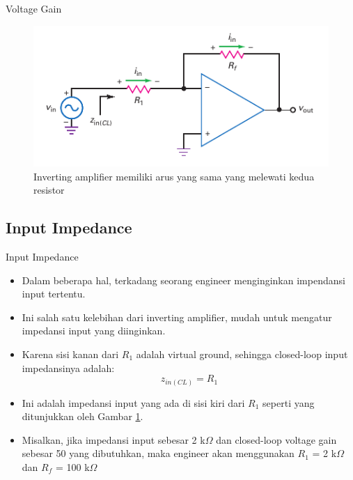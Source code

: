 \begin{frame}{Voltage Gain}
	\begin{figure}
		\centering
		\includegraphics[height=0.4\textheight]{gambar/fig-16.14}
		\caption{Inverting amplifier memiliki arus yang sama yang melewati kedua resistor}
		\label{fig-16.14}
	\end{figure}
\end{frame}

\subsection{Input Impedance}

\begin{frame}{Input Impedance}
	\begin{itemize}
		\item Dalam beberapa hal, terkadang seorang engineer menginginkan impendansi input tertentu.
		\item Ini salah satu kelebihan dari inverting amplifier, mudah untuk mengatur impedansi input yang diinginkan.
		\item Karena sisi kanan dari $ R_1 $ adalah virtual ground, sehingga closed-loop input impedansinya adalah:\\

		\begin{equation}\label{pers.16.04}
			z_{in(CL)} = R_1
		\end{equation}

		\item Ini adalah impedansi input yang ada di sisi kiri dari $ R_1 $ seperti yang ditunjukkan oleh Gambar \ref{fig-16.14}.
		\item Misalkan, jika impedansi input sebesar 2 k$\Omega$ dan closed-loop voltage gain sebesar 50 yang dibutuhkan, maka engineer akan menggunakan $ R_1 $ = 2 k$\Omega$ dan $ R_f $ = 100 k$\Omega$
	\end{itemize}
\end{frame}

